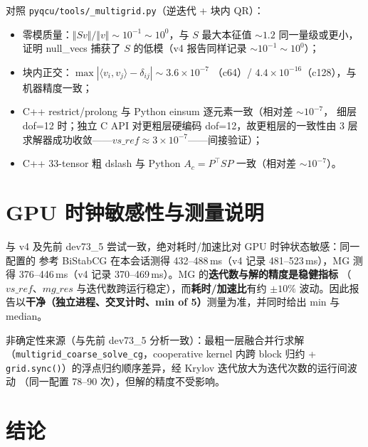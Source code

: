 \documentclass[11pt,a4paper]{article}
\begin{document}
对照 \texttt{pyqcu/tools/\_multigrid.py}（逆迭代 + 块内 QR）：
\begin{itemize}
  \item 零模质量：$\Vert S v\Vert/\Vert v\Vert\sim10^{-1}\sim10^0$，与 $S$ 最大本征值
        $\sim1.2$ 同一量级或更小，证明 null\_vecs 捕获了 $S$ 的低模（v4 报告同样记录
        $\sim10^{-1}\sim10^0$）；
  \item 块内正交：$\max|\langle v_i,v_j\rangle-\delta_{ij}|\sim3.6\times10^{-7}$
        （c64）/ $4.4\times10^{-16}$（c128），与机器精度一致；
  \item C++ restrict/prolong 与 Python einsum 逐元素一致（相对差 $\sim10^{-7}$，
        细层 dof=12 时；独立 C API 对更粗层硬编码 dof=12，故更粗层的一致性由 3 层
        求解器成功收敛——$vs\_ref\approx3\times10^{-7}$——间接验证）；
  \item C++ 33-tensor 粗 dslash 与 Python $A_c=P^\top S P$ 一致（相对差
        $\sim10^{-7}$）。
\end{itemize}

\section{GPU 时钟敏感性与测量说明}
\label{sec:gpu}

与 v4 及先前 dev73\_5 尝试一致，绝对耗时/加速比对 GPU 时钟状态敏感：同一配置的
参考 BiStabCG 在本会话测得 432--488\,ms（v4 记录 481--523\,ms），MG 测得
376--446\,ms（v4 记录 370--469\,ms）。MG 的\textbf{迭代数与解的精度是稳健指标}
（$vs\_ref$、$mg\_res$ 与迭代数跨运行稳定），而\textbf{耗时/加速比}有约 $\pm10\%$
波动。因此报告以\textbf{干净（独立进程、交叉计时、min of 5）}测量为准，并同时给出
min 与 median。

非确定性来源（与先前 dev73\_5 分析一致）：最粗一层融合并行求解
（\texttt{multigrid\_coarse\_solve\_cg}，cooperative kernel 内跨 block 归约 +
\texttt{grid.sync()}）的浮点归约顺序差异，经 Krylov 迭代放大为迭代次数的运行间波动
（同一配置 78--90 次），但解的精度不受影响。

\section{结论}
\label{sec:conclusion}
\end{document}
